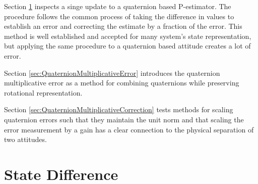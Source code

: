 Section \ref{sec:StateDifference} inspects a singe update to a quaternion based P-estimator.  The procedure follows the common process of taking the difference in values to establish an error and correcting the estimate by a fraction of the error.  This method is well established and accepted for many system's state representation, but applying the same procedure to a quaternion based attitude creates a lot of error.

Section \ref{sec:QuaternionMultiplicativeError} introduces the quaternion multiplicative error as a method for combining quaternions while preserving rotational representation.

Section \ref{sec:QuaternionMultiplicativeCorrection} tests methods for scaling quaternion errors such that they maintain the unit norm and that scaling the error measurement by a gain has a clear connection to the physical separation of two attitudes.

\section{State Difference}
\label{sec:StateDifference}

